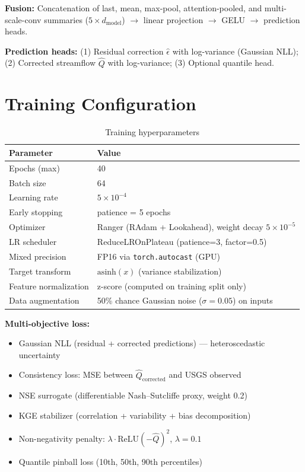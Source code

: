 \documentclass[11pt]{article}
\begin{document}
\textbf{Fusion:} Concatenation of last, mean, max-pool, attention-pooled, and multi-scale-conv summaries ($5 \times d_{\mathrm{model}}$) $\rightarrow$ linear projection $\rightarrow$ GELU $\rightarrow$ prediction heads.

\textbf{Prediction heads:} (1) Residual correction $\hat{\epsilon}$ with log-variance (Gaussian NLL); (2) Corrected streamflow $\hat{Q}$ with log-variance; (3) Optional quantile head.

\section{Training Configuration}

\begin{table}[h]
\centering
\caption{Training hyperparameters}
\begin{tabular}{ll}
\toprule
\textbf{Parameter} & \textbf{Value} \\
\midrule
Epochs (max)           & 40 \\
Batch size             & 64 \\
Learning rate          & $5 \times 10^{-4}$ \\
Early stopping         & patience = 5 epochs \\
Optimizer              & Ranger (RAdam + Lookahead), weight decay $5 \times 10^{-5}$ \\
LR scheduler           & ReduceLROnPlateau (patience=3, factor=0.5) \\
Mixed precision        & FP16 via \texttt{torch.autocast} (GPU) \\
Target transform       & $\mathrm{asinh}(x)$ (variance stabilization) \\
Feature normalization  & z-score (computed on training split only) \\
Data augmentation      & 50\% chance Gaussian noise ($\sigma = 0.05$) on inputs \\
\bottomrule
\end{tabular}
\end{table}

\textbf{Multi-objective loss:}
\begin{itemize}
    \item Gaussian NLL (residual + corrected predictions) --- heteroscedastic uncertainty
    \item Consistency loss: MSE between $\hat{Q}_{\mathrm{corrected}}$ and USGS observed
    \item NSE surrogate (differentiable Nash--Sutcliffe proxy, weight 0.2)
    \item KGE stabilizer (correlation + variability + bias decomposition)
    \item Non-negativity penalty: $\lambda \cdot \mathrm{ReLU}(-\hat{Q})^2$, $\lambda = 0.1$
    \item Quantile pinball loss (10th, 50th, 90th percentiles)
\end{itemize}
\end{document}
